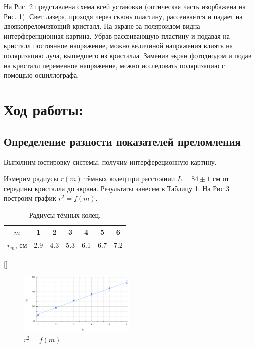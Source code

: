 \documentclass[11pt]{article}
\begin{document}
На Рис. 2 представлена схема всей установки (оптическая часть изорбажена на Рис. 1). Свет лазера, проходя через сквозь пластину, рассеивается и падает на двоякопреломляющий кристалл. На экране за поляроидом видна интерференционная картина. Убрав рассеивающую пластину и подавая на кристалл постоянное напряжение, можно величиной напряжения влиять на поляризацию луча, вышедшего из кристалла. Заменив экран фотодиодом и подав на кристалл переменное напряжение, можно исследовать поляризацию с помощью осциллографа.
\newpage


\section{Ход работы:}


\subsection*{Определение разности показателей преломления}

Выполним юстировку системы, получим интерфереционную картину. 

Измерим радиусы $r(m)$ тёмных колец при расстоянии $L =84 \pm 1 \text{ см}$ от середины кристалла до экрана. Результаты занесем в Таблицу 1. На Рис 3 построим график $r^2 = f(m)$.

\begin{table}[h]
\caption{Радиусы тёмных колец.}
\centering
\begin{tabular}{|c|c|c|c|c|c|c|}
\hline
$m$     & 1   & 2   & 3   & 4   & 5   & 6   \\ \hline
$r_m$, см & 2.9 & 4.3 & 5.3 & 6.1 & 6.7 & 7.2  \\ \hline
\end{tabular}
\end{table}[]


\begin{figure}
\begin{center}
\includegraphics[width = 0.5\textwidth]{gr1.png}
\end{center}
\vspace{-20pt}
\caption{$r^2=f(m)$}
\end{figure}
\end{document}
